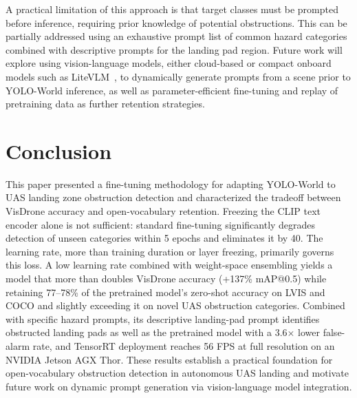 \documentclass[conf]{new-aiaa}
\begin{document}
A practical limitation of this approach is that target classes must be prompted before
inference, requiring prior knowledge of potential obstructions. This can be partially
addressed using an exhaustive prompt list of common hazard categories combined with
descriptive prompts for the landing pad region. Future work will explore using
vision-language models, either cloud-based or compact onboard models such as
LiteVLM~\cite{huang2025litevlmlowlatencyvisionlanguagemodel}, to dynamically generate prompts
from a scene prior to YOLO-World inference, as well as parameter-efficient fine-tuning and
replay of pretraining data as further retention strategies.

\section{Conclusion}

This paper presented a fine-tuning methodology for adapting YOLO-World to UAS landing zone
obstruction detection and characterized the tradeoff between VisDrone accuracy and
open-vocabulary retention. Freezing the CLIP text encoder alone is not sufficient: standard
fine-tuning significantly degrades detection of unseen categories within 5 epochs and
eliminates it by 40. The learning rate, more than training duration or layer freezing,
primarily governs this loss. A low learning rate combined with weight-space ensembling yields
a model that more than doubles VisDrone accuracy (+137\% mAP@0.5) while retaining 77--78\% of
the pretrained model's zero-shot accuracy on LVIS and COCO and slightly exceeding it on novel
UAS obstruction categories. Combined with specific hazard prompts, its descriptive landing-pad
prompt identifies obstructed landing pads as well as the pretrained model with a
3.6$\times$ lower false-alarm rate, and TensorRT deployment reaches 56 FPS at full resolution
on an NVIDIA Jetson AGX Thor. These results establish a practical foundation for
open-vocabulary obstruction detection in autonomous UAS landing and motivate future work on
dynamic prompt generation via vision-language model integration.




\end{document}
